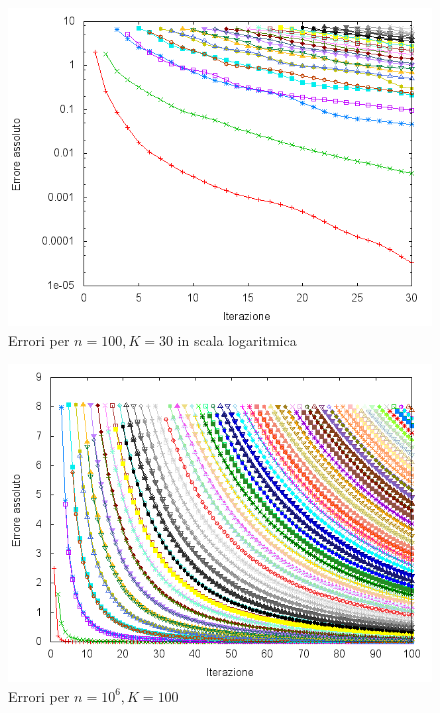\documentclass[11pt]{article}
\numberwithin{equation}{subsection}
\theoremstyle{connome}
\theoremstyle{connomesenzanumero}
\theoremstyle{connome+}
\theoremstyle{connomesenzanumero+}
\begin{document}
\begin{figure}[htb]
\centering
\includegraphics[width=.9\linewidth]{./img/errors_n100K30_log.png}
\caption{Errori per $n=100, K=30$ in scala logaritmica}
\end{figure}

\begin{figure}[htb]
\centering
\includegraphics[width=.9\linewidth]{./img/errors_n10^6K100.png}
\caption{\label{errori_ngrande}Errori per $n=10^6, K=100$}
\end{figure}
\end{document}
